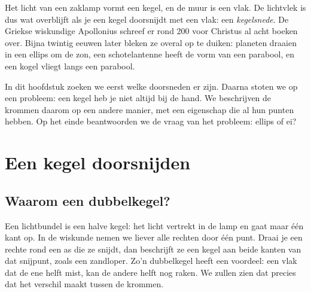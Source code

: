 
Het licht van een zaklamp vormt een kegel, en de muur is een vlak. De lichtvlek is dus wat overblijft als je een kegel doorsnijdt met een vlak: een \emph{kegelsnede}. De Griekse wiskundige Apollonius schreef er rond 200 voor Christus al acht boeken over. Bijna twintig eeuwen later bleken ze overal op te duiken: planeten draaien in een ellips om de zon, een schotelantenne heeft de vorm van een parabool, en een kogel vliegt langs een parabool.

In dit hoofdstuk zoeken we eerst welke doorsneden er zijn. Daarna stoten we op een probleem: een kegel heb je niet altijd bij de hand. We beschrijven de krommen daarom op een andere manier, met een eigenschap die al hun punten hebben. Op het einde beantwoorden we de vraag van het probleem: ellips of ei?

\begin{oefeningen}[Start]

\end{oefeningen}

\section{Een kegel doorsnijden}

\subsection{Waarom een dubbelkegel?}

Een lichtbundel is een halve kegel: het licht vertrekt in de lamp en gaat maar één kant op. In de wiskunde nemen we liever alle rechten door één punt. Draai je een rechte rond een as die ze snijdt, dan beschrijft ze een kegel aan beide kanten van dat snijpunt, zoals een zandloper. Zo'n dubbelkegel heeft een voordeel: een vlak dat de ene helft mist, kan de andere helft nog raken. We zullen zien dat precies dat het verschil maakt tussen de krommen.

